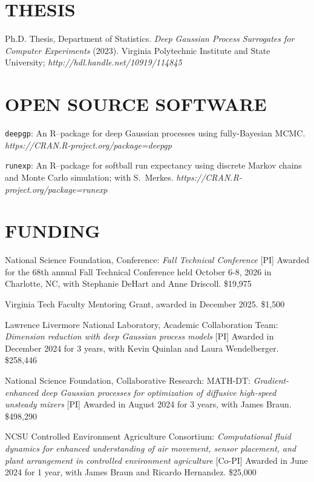 \documentclass[margin,line,11pt]{res}
\begin{document}
\begin{resume}
\medskip
\section{\bf THESIS}

Ph.D. Thesis, Department of Statistics.  {\it Deep Gaussian Process
Surrogates for Computer Experiments} (2023). Virginia Polytechnic Institute
and State University; {\it http://hdl.handle.net/10919/114845}

\medskip
\section{\bf OPEN SOURCE SOFTWARE}

{\tt deepgp}: An {\sf R}--package for deep Gaussian processes 
using fully-Bayesian MCMC.\\
{\sl https://CRAN.R-project.org/package=deepgp}

{\tt runexp}: An {\sf R}--package for softball run expectancy using 
discrete Markov chains and Monte Carlo simulation; with S.~Merkes.
{\sl https://CRAN.R-project.org/package=runexp}


\section{\bf FUNDING}

National Science Foundation, Conference: {\it Fall Technical Conference} [PI]
Awarded for the 68th annual Fall Technical Conference held October 6-8, 2026
in Charlotte, NC, with Stephanie DeHart and Anne Driscoll. \hfill \$19,975

Virginia Tech Faculty Mentoring Grant, awarded in December 2025. \hfill \$1,500

Lawrence Livermore National Laboratory, Academic Collaboration Team: {\it Dimension reduction with 
deep Gaussian process models} [PI] Awarded in December 2024 for 3 years, with Kevin Quinlan
and Laura Wendelberger. \hfill \$258,446

National Science Foundation, Collaborative Research: MATH-DT: {\it Gradient-enhanced
deep Gaussian processes for optimization of diffusive high-speed unsteady mixers} [PI]
Awarded in August 2024 for 3 years, with James Braun.  \hfill \$498,290

NCSU Controlled Environment Agriculture Consortium: {\it Computational fluid dynamics for
enhanced understanding of air movement, sensor placement, and plant arrangement in controlled
environment agriculture} [Co-PI] Awarded in June 2024 for 1 year, with James Braun and 
Ricardo Hernandez. \hfill \$25,000



\end{resume}
\end{document}
